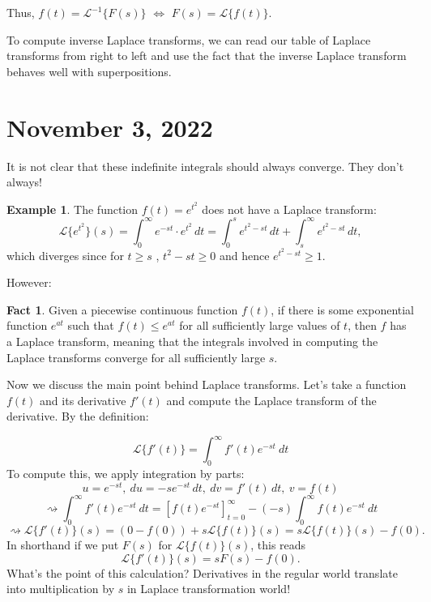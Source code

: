 \documentclass[12pt]{amsart}
\numberwithin{equation}{section}
\theoremstyle{plain} %
\newcommand{\Nov}[1]{\section{November #1, 2022}}
\newcommand{\rsa}{\rightsquigarrow}
\theoremstyle{definition}
\newtheorem{ex}[equation]{Example}
\newtheorem{fact}[equation]{Fact}
\theoremstyle{remark}
\newcommand{\LA}[1]{\mathcal{L}\{ #1 \}}
\newcommand{\LAi}[1]{\mathcal{L}^{-1}\{ #1 \}}
\begin{document}
Thus, $f(t) = \LAi{F(s)}$ $\Leftrightarrow$ $F(s) = \LA{f(t)}$.

To compute inverse Laplace transforms, we can read our table of Laplace transforms from right to left and use the fact that the inverse Laplace transform behaves well with superpositions.



\Nov{3}



It is not clear that these indefinite integrals should always converge. They don't always!
\begin{ex}
The function $f(t)= e^{t^2}$ does not have a Laplace transform:
\[ \LA{e^{t^2}}(s) =  \int_0^\infty e^{-st} \cdot e^{t^2} \, dt = \int_0^s e^{t^2-st}  \, dt + \int_s^\infty e^{t^2-st}  \, dt,\]
which diverges since for $t\geq s$ , $t^2-st\geq 0$ and hence $e^{t^2-st}\geq 1$.
\end{ex}

 However:
\begin{fact}
Given a piecewise continuous function $f(t)$, if there is some exponential function $e^{at}$ such that $f(t)\leq e^{at}$ for all sufficiently large values of $t$, then $f$ has a Laplace transform, meaning that the integrals involved in computing the Laplace transforms converge for all sufficiently large $s$.
\end{fact}



Now we discuss the main point behind Laplace transforms. Let's take a function $f(t)$ and its derivative $f'(t)$ and compute the Laplace transform of the derivative. By the definition:

\[ \LA{f'(t)} = \int_{0}^\infty f'(t) e^{-st} \ dt\]
To compute this, we apply integration by parts: 
\[u=e^{-st}, \ du = -s e^{-st} \, dt,  \ dv = f'(t) \, dt,  \ v=f(t)\]
\[ \rsa \int_{0}^\infty f'(t) e^{-st} \ dt = \left[ f(t) e^{-st} \right]_{t=0}^\infty - (-s) \int_{0}^\infty f(t) e^{-st} \ dt\]
\[ \rsa \LA{f'(t)}(s) = (0 - f(0))  + s \LA{f(t)}(s) = s \LA{f(t)}(s) - f(0).\]
In shorthand if we put $F(s)$ for $\LA{f(t)}(s)$, this reads
\[  \LA{f'(t)}(s) = s F(s) - f(0).\]
What's the point of this calculation? Derivatives in the regular world translate into multiplication by $s$ in Laplace transformation world!
\end{document}
